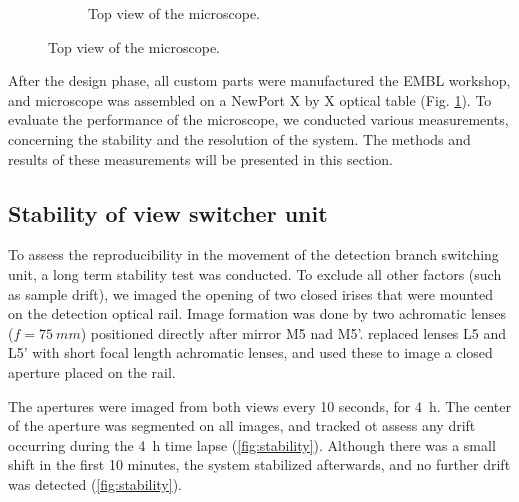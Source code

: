 \begin{figure}[htb]
\begin{subfigure}[t]{1\textwidth}
      \caption{Top view of the microscope.}
    \end{subfigure}
    \label{fig:frontView}
  \end{figure}


  After the design phase, all custom parts were manufactured the EMBL workshop, and microscope was assembled on a NewPort X by X optical table (Fig. \ref{fig:frontView}). To evaluate the performance of the microscope, we conducted various measurements, concerning the stability and the resolution of the system. The methods and results of these measurements will be presented in this section.


  \subsection{Stability of view switcher unit}
    \label{sec:mirrorStability}
    To assess the reproducibility in the movement of the detection branch switching unit, a long term stability test was conducted. To exclude all other factors (such as sample drift), we imaged the opening of two closed irises that were mounted on the detection optical rail. Image formation was done by two achromatic lenses ($f=\SI{75}{mm}$) positioned directly after mirror M5 nad M5'.
    replaced lenses L5 and L5' with short focal length achromatic lenses, and used these to image a closed aperture placed on the rail. 
    
    The apertures were imaged from both views every 10 seconds, for \SI{4}{h}. The center of the aperture was segmented on all images, and tracked ot assess any drift occurring during the \SI{4}{h} time lapse (\autoref{fig:stability}). Although there was a small shift in the first 10 minutes, the system stabilized afterwards, and no further drift was detected (\autoref{fig:stability}).

